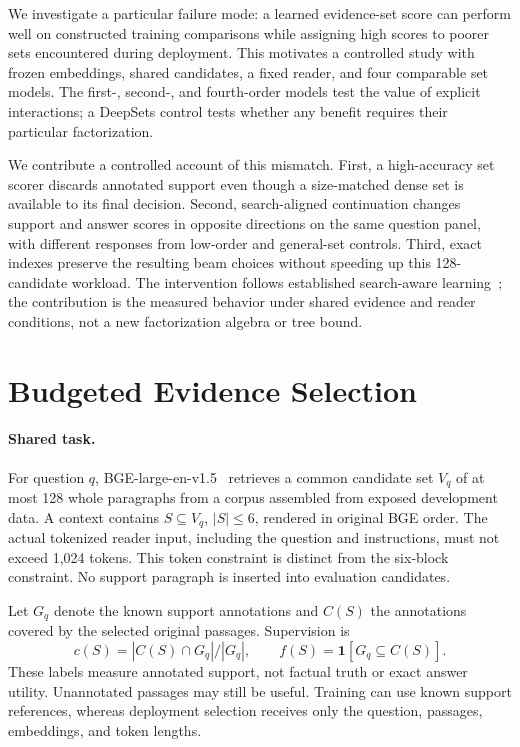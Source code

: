 \documentclass[runningheads]{llncs}
\begin{document}
We investigate a particular failure mode: a learned evidence-set score can
perform well on constructed training comparisons while assigning high
scores to poorer sets encountered during deployment. This motivates a
controlled study with frozen embeddings, shared candidates, a fixed
reader, and four comparable set models. The first-, second-, and
fourth-order models test the value of explicit interactions; a DeepSets
control tests whether any benefit requires their particular factorization.

We contribute a controlled account of this mismatch. First, a high-accuracy
set scorer discards annotated support even though a size-matched dense set
is available to its final decision. Second, search-aligned continuation
changes support and answer scores in opposite directions on the same
question panel, with different responses from low-order and general-set
controls. Third, exact indexes preserve the resulting beam choices without
speeding up this 128-candidate workload. The intervention follows established
search-aware learning~\cite{wiseman2016bso}; the contribution is the measured
behavior under shared evidence and reader conditions, not a new
factorization algebra or tree bound.

\section{Budgeted Evidence Selection}
\paragraph{Shared task.}
For question $q$, BGE-large-en-v1.5~\cite{xiao2023bge} retrieves a common candidate set $V_q$ of at most 128
whole paragraphs from a corpus assembled from exposed development data. A context contains
$S\subseteq V_q$, $|S|\leq6$, rendered in original BGE order. The actual
tokenized reader input, including the question and instructions, must not
exceed 1,024 tokens. This token constraint is distinct from the six-block
constraint. No support paragraph is inserted into evaluation candidates.

Let $G_q$ denote the known support annotations and $C(S)$ the annotations
covered by the selected original passages. Supervision is
\begin{equation}
 c(S)=|C(S)\cap G_q|/|G_q|,\qquad f(S)=\mathbf1[G_q\subseteq C(S)].
\end{equation}
These labels measure annotated support, not factual truth or exact answer
utility. Unannotated passages may still be useful. Training can use known
support references, whereas deployment selection receives only the question,
passages, embeddings, and token lengths.
\end{document}
